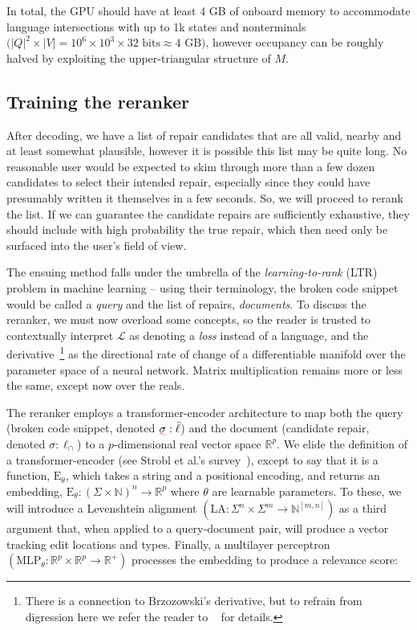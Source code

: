 \documentclass[sigplan,review,acmsmall,nonacm,screen,anonymous]{acmart}\settopmatter{printfolios=false,printccs=false,printacmref=false}
\begin{document}
In total, the GPU should have at least 4 GB of onboard memory to accommodate language intersections with up to 1k states and nonterminals $\big(|Q|^2\times|V|=10^6\times10^3\times 32 \text{ bits} \approx \text{4 GB}\big)$, however occupancy can be roughly halved by exploiting the upper-triangular structure of $M$.

\clearpage\subsection{Training the reranker}

After decoding, we have a list of repair candidates that are all valid, nearby and at least somewhat plausible, however it is possible this list may be quite long. No reasonable user would be expected to skim through more than a few dozen candidates to select their intended repair, especially since they could have presumably written it themselves in a few seconds. So, we will proceed to rerank the list. If we can guarantee the candidate repairs are sufficiently exhaustive, they should include with high probability the true repair, which then need only be surfaced into the user's field of view.

The ensuing method falls under the umbrella of the \textit{learning-to-rank} (LTR) problem in machine learning -- using their terminology, the broken code snippet would be called a \textit{query} and the list of repairs, \textit{documents}. To discuss the reranker, we must now overload some concepts, so the reader is trusted to contextually interpret $\mathcal{L}$ as denoting a \textit{loss} instead of a language, and the derivative~\footnote{There is a connection to Brzozowski's derivative, but to refrain from digression here we refer the reader to ~\cite{elliott2019generalized} for details.} as the directional rate of change of a differentiable manifold over the parameter space of a neural network. Matrix multiplication remains more or less the same, except now over the reals.

The reranker employs a transformer-encoder architecture to map both the query (broken code snippet, denoted $\err\sigma: \bar\ell$) and the document (candidate repair, denoted $\sigma: \ell_\cap$) to a $p$-dimensional real vector space $\mathbb{R}^p$. We elide the definition of a transformer-encoder (see Strobl et al.'s survey~\cite{strobl2024formal}), except to say that it is a function, $\text{E}_\theta$, which takes a string and a positional encoding, and returns an embedding, $\text{E}_\theta: (\Sigma\times \mathbb{N})^n \rightarrow \mathbb{R}^p$ where $\theta$ are learnable parameters. To these, we will introduce a Levenshtein alignment $(\text{LA}: \Sigma^n \times \Sigma^m \rightarrow \mathbb{N}^{[m, n]})$ as a third argument that, when applied to a query-document pair, will produce a vector tracking edit locations and types. Finally, a multilayer perceptron $(\text{MLP}_\theta: \mathbb{R}^p \times \mathbb{R}^p \rightarrow \mathbb{R}^+)$ processes the embedding to produce a relevance score:
\end{document}
